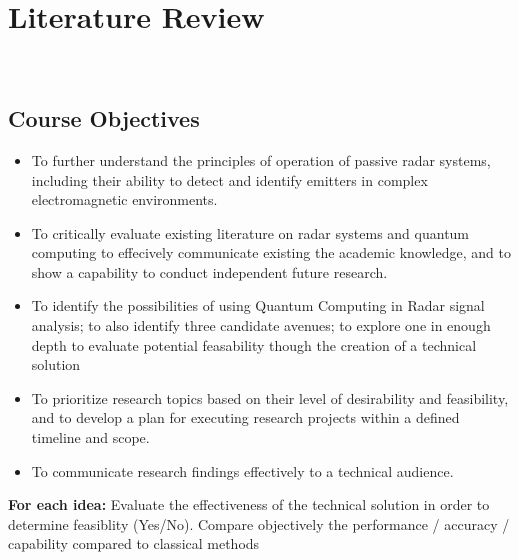 \section{Literature Review}~\label{sec:literature}


\subsection{Course Objectives}

\begin{itemize}
    \item To further understand the principles of operation of passive radar systems, including their ability to detect and identify emitters in complex electromagnetic environments.
    \item To critically evaluate existing literature on radar systems and quantum computing to effecively communicate existing the academic knowledge, and to show a capability to conduct independent future research.
    \item To identify the possibilities of using Quantum Computing in Radar signal analysis; to also identify three candidate avenues; to explore one in enough depth to evaluate potential feasability though the creation of a technical solution
    \item To prioritize research topics based on their level of desirability and feasibility, and to develop a plan for executing research projects within a defined timeline and scope.
    \item To communicate research findings effectively to a technical audience.
\end{itemize}

\textbf{For each idea:}
Evaluate the effectiveness of the technical solution in order to determine feasiblity (Yes/No). Compare objectively the performance / accuracy / capability compared to classical methods

